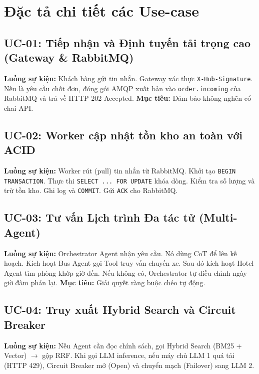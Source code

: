 \section{Đặc tả chi tiết các Use-case}

\subsection{UC-01: Tiếp nhận và Định tuyến tải trọng cao (Gateway \& RabbitMQ)}
\textbf{Luồng sự kiện:} Khách hàng gửi tin nhắn. Gateway xác thực \texttt{X-Hub-Signature}. Nếu là yêu cầu chốt đơn, đóng gói AMQP xuất bản vào \texttt{order.incoming} của RabbitMQ và trả về HTTP 202 Accepted.
\textbf{Mục tiêu:} Đảm bảo không nghẽn cổ chai API.

\subsection{UC-02: Worker cập nhật tồn kho an toàn với ACID}
\textbf{Luồng sự kiện:} Worker rút (pull) tin nhắn từ RabbitMQ. Khởi tạo \texttt{BEGIN TRANSACTION}. Thực thi \texttt{SELECT ... FOR UPDATE} khóa dòng. Kiểm tra số lượng và trừ tồn kho. Ghi log và \texttt{COMMIT}. Gửi \texttt{ACK} cho RabbitMQ.

\subsection{UC-03: Tư vấn Lịch trình Đa tác tử (Multi-Agent)}
\textbf{Luồng sự kiện:} Orchestrator Agent nhận yêu cầu. Nó dùng CoT để lên kế hoạch. Kích hoạt Bus Agent gọi Tool truy vấn chuyến xe. Sau đó kích hoạt Hotel Agent tìm phòng khớp giờ đến. Nếu không có, Orchestrator tự điều chỉnh ngày giờ đàm phán lại.
\textbf{Mục tiêu:} Giải quyết ràng buộc chéo tự động.

\subsection{UC-04: Truy xuất Hybrid Search và Circuit Breaker}
\textbf{Luồng sự kiện:} Nếu Agent cần đọc chính sách, gọi Hybrid Search (BM25 + Vector) $\rightarrow$ gộp RRF. Khi gọi LLM inference, nếu máy chủ LLM 1 quá tải (HTTP 429), Circuit Breaker mở (Open) và chuyển mạch (Failover) sang LLM 2.
